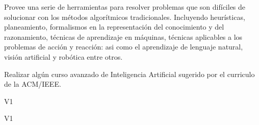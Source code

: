 \begin{syllabus}


\begin{justification}
Provee una serie de herramientas para resolver problemas que son difíciles de solucionar con los métodos algorítmicos tradicionales. Incluyendo heurísticas, planeamiento, formalismos en la representación del conocimiento y del razonamiento, técnicas de aprendizaje en máquinas, técnicas aplicables a los problemas de acción y reacción: asi como el aprendizaje de lenguaje natural, visión artificial y robótica entre otros. 
\end{justification}

\begin{goals}
\item Realizar algún curso avanzado de Inteligencia Artificial sugerido por el curriculo de la ACM/IEEE.
\end{goals}

\begin{outcomes}{V1}
\item {}
\item {}
\item {}
\item {}
\end{outcomes}

\begin{competences}{V1}
\item {} 
\item {} 
\item {}
\end{competences}


\end{syllabus}
